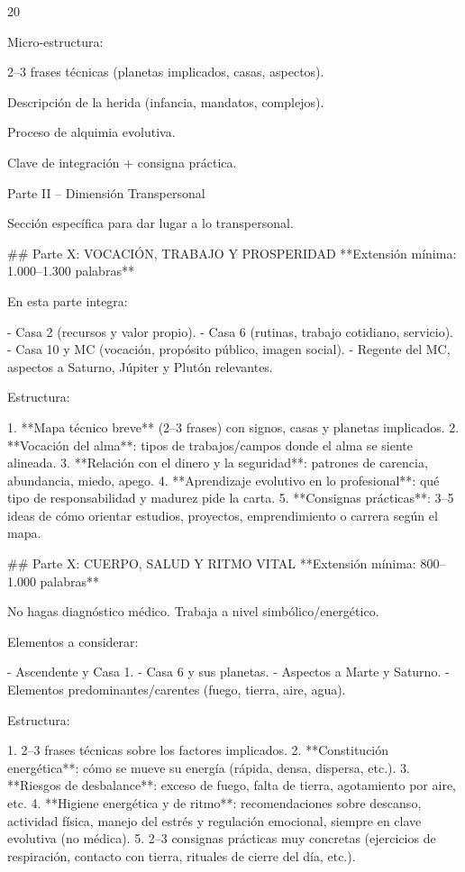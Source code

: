 20%

Micro-estructura:

2–3 frases técnicas (planetas implicados, casas, aspectos).

Descripción de la herida (infancia, mandatos, complejos).

Proceso de alquimia evolutiva.

Clave de integración + consigna práctica.

Parte II – Dimensión Transpersonal

Sección específica para dar lugar a lo transpersonal.

## Parte X: VOCACIÓN, TRABAJO Y PROSPERIDAD  
**Extensión mínima: 1.000–1.300 palabras**

En esta parte integra:

- Casa 2 (recursos y valor propio).  
- Casa 6 (rutinas, trabajo cotidiano, servicio).  
- Casa 10 y MC (vocación, propósito público, imagen social).  
- Regente del MC, aspectos a Saturno, Júpiter y Plutón relevantes.

Estructura:

1. **Mapa técnico breve** (2–3 frases) con signos, casas y planetas implicados.  
2. **Vocación del alma**: tipos de trabajos/campos donde el alma se siente alineada.  
3. **Relación con el dinero y la seguridad**: patrones de carencia, abundancia, miedo, apego.  
4. **Aprendizaje evolutivo en lo profesional**: qué tipo de responsabilidad y madurez pide la carta.  
5. **Consignas prácticas**: 3–5 ideas de cómo orientar estudios, proyectos, emprendimiento o carrera según el mapa.

## Parte X: CUERPO, SALUD Y RITMO VITAL  
**Extensión mínima: 800–1.000 palabras**

No hagas diagnóstico médico. Trabaja a nivel simbólico/energético.

Elementos a considerar:

- Ascendente y Casa 1.  
- Casa 6 y sus planetas.  
- Aspectos a Marte y Saturno.  
- Elementos predominantes/carentes (fuego, tierra, aire, agua).

Estructura:

1. 2–3 frases técnicas sobre los factores implicados.  
2. **Constitución energética**: cómo se mueve su energía (rápida, densa, dispersa, etc.).  
3. **Riesgos de desbalance**: exceso de fuego, falta de tierra, agotamiento por aire, etc.  
4. **Higiene energética y de ritmo**: recomendaciones sobre descanso, actividad física, manejo del estrés y regulación emocional, siempre en clave evolutiva (no médica).  
5. 2–3 consignas prácticas muy concretas (ejercicios de respiración, contacto con tierra, rituales de cierre del día, etc.).

